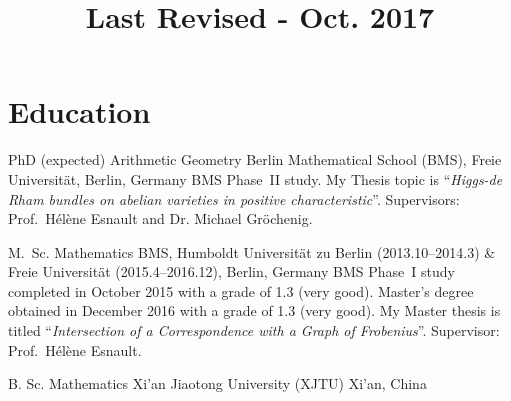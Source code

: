 \documentclass[11pt,a4paper,roman]{moderncv}
\title{\normalsize Last Revised - Oct. 2017}
\begin{document}
\maketitle





\section{Education}
%
{PhD (expected)}%
{Arithmetic Geometry}%
{Berlin Mathematical School (BMS), Freie Universität, Berlin, Germany}%
{}%
{
    BMS Phase~II study. My Thesis topic is
    ``\emph{Higgs-de Rham bundles on abelian varieties
    in positive characteristic}''.
    Supervisors: Prof.\ Hélène Esnault and Dr. Michael Gröchenig.
}

{M.\ Sc.}%
{Mathematics}%
{%
    BMS, Humboldt Universität zu Berlin (2013.10--2014.3) \&
    Freie Universität (2015.4--2016.12), Berlin, Germany
}%
{}%
{%
    BMS Phase~I study completed in October 2015 with a grade of 1.3 (very good).
    Master's degree obtained in December 2016 with a grade of 1.3 (very good).
    My Master thesis is titled
    ``\emph{Intersection of a Correspondence with a Graph of Frobenius}''.
    Supervisor: Prof.\ Hélène Esnault.
}

%
{B. Sc.}%
{Mathematics}%
{Xi'an Jiaotong University (XJTU)}%
{Xi'an, China}{}%
\end{document}
